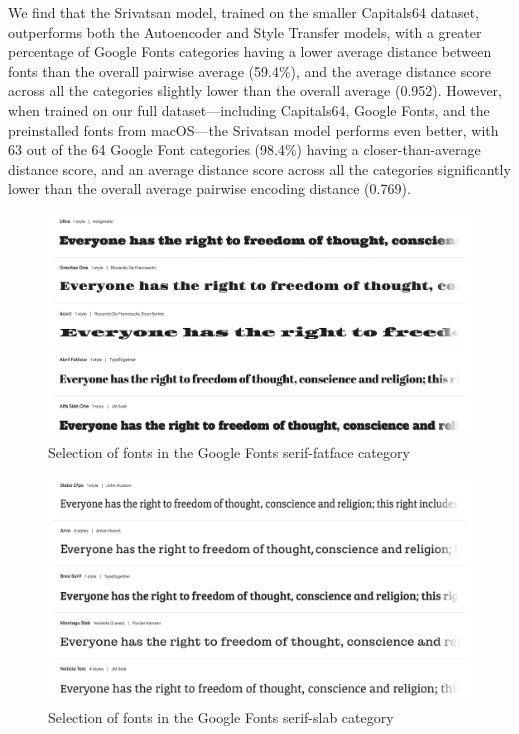 We find that the Srivatsan model, trained on the smaller Capitals64 dataset, outperforms both the Autoencoder and Style Transfer models, with a greater percentage of Google Fonts categories having a lower average distance between fonts than the overall pairwise average (59.4\%), and the average distance score across all the categories slightly lower than the overall average (0.952). However, when trained on our full dataset---including Capitals64, Google Fonts, and the preinstalled fonts from macOS---the Srivatsan model performs even better, with 63 out of the 64 Google Font categories (98.4\%) having a closer-than-average distance score, and an average distance score across all the categories significantly lower than the overall average pairwise encoding distance (0.769).

\begin{figure}[p]
    \centering
    \includegraphics[width=\textwidth]{images/serif-fatface.png}
    \caption{Selection of fonts in the Google Fonts serif-fatface category}
    \label{fig:serif-fatface}
\end{figure}

\begin{figure}[p]
    \centering
    \includegraphics[width=\textwidth]{images/serif-slab.png}
    \caption{Selection of fonts in the Google Fonts serif-slab category}
    \label{fig:serif-slab}
\end{figure}


